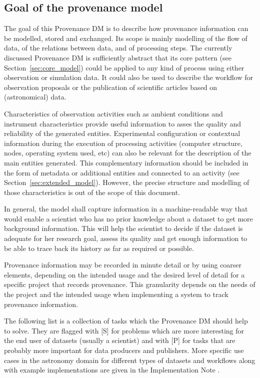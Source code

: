 \subsection{Goal of the provenance model}\label{sec:goals}

The goal of this Provenance DM is to describe how provenance information
can be modelled, stored and exchanged. Its scope
is mainly modelling of the flow of data, of the relations between data,
and of processing steps. The currently discussed Provenance DM is sufficiently abstract that its core pattern (see Section~\ref{sec:core_model}) could be applied to any kind of process using either observation or simulation data.
It could also be used to describe the workflow for observation proposals or the publication of scientific articles based on (astronomical) data.

Characteristics of observation activities such as ambient conditions and
instrument characteristics provide useful information to asses the quality and reliability of the generated entities. 
Experimental configuration or contextual information during
the execution of processing activities (computer structure, nodes, operating
system used, etc) can also be relevant for the description of the main entities generated. This complementary information should be included in the form of metadata or additional entities and connected to an activity (see Section~\ref{sec:extended_model}). However, the precise structure and modelling of those characteristics is out of the scope of this document. 

In general, the model shall capture information in a machine-readable way that would enable a scientist who has no prior knowledge about a dataset to get more background information. 
This will help the scientist to decide if the dataset 
is adequate for her research goal, assess its quality and get enough information
to be able to trace back its history as far as required or possible. 

Provenance information may be recorded in minute detail or by using coarser
elements, depending on the intended usage and the desired level of detail
for a specific project that records provenance. 
This granularity depends on the needs of the project and the intended usage when implementing a system to track provenance information.

The following list is a collection of tasks which the Provenance DM should help to solve. They are flagged with [S] for problems which are more interesting for the end user of datasets (usually a scientist) and with [P] for tasks that are probably more important for data producers and publishers.
More specific use cases in the astronomy domain for different types of datasets and workflows along with example implementations are given in the Implementation Note \citep{std:ProvenanceImplementationNote}.


